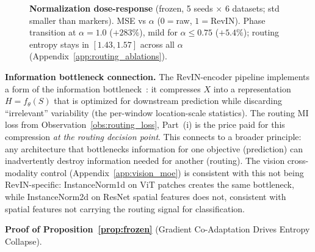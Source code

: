 \documentclass{article}
\begin{document}
\begin{figure}[!htbp]
\caption{\textbf{Normalization dose-response} (frozen, 5 seeds $\times$ 6 datasets; std smaller than markers). MSE vs $\alpha$ ($0{=}$raw, $1{=}$RevIN). Phase transition at $\alpha{=}1.0$ ($+283\%$), mild for $\alpha{\leq}0.75$ ($+5.4\%$); routing entropy stays in $[1.43,1.57]$ across all $\alpha$ (Appendix~\ref{app:routing_ablations}).}
\label{fig:dose_response}
\end{figure}

\textbf{Information bottleneck connection.}
The RevIN-encoder pipeline implements a form of the information bottleneck~\citep{tishby2000ib,alemi2017vib}: it compresses $X$ into a representation $H = f_\theta(S)$ that is optimized for downstream prediction while discarding ``irrelevant'' variability (the per-window location-scale statistics). The routing MI loss from Observation~\ref{obs:routing_loss}, Part~(i) is the price paid for this compression \emph{at the routing decision point}. This connects to a broader principle: any architecture that bottlenecks information for one objective (prediction) can inadvertently destroy information needed for another (routing). The vision cross-modality control (Appendix~\ref{app:vision_moe}) is consistent with this not being RevIN-specific: InstanceNorm1d on ViT patches creates the same bottleneck, while InstanceNorm2d on ResNet spatial features does not, consistent with spatial features not carrying the routing signal for classification.

\textbf{Proof of Proposition~\ref{prop:frozen}} (Gradient Co-Adaptation Drives Entropy Collapse).
\end{document}
